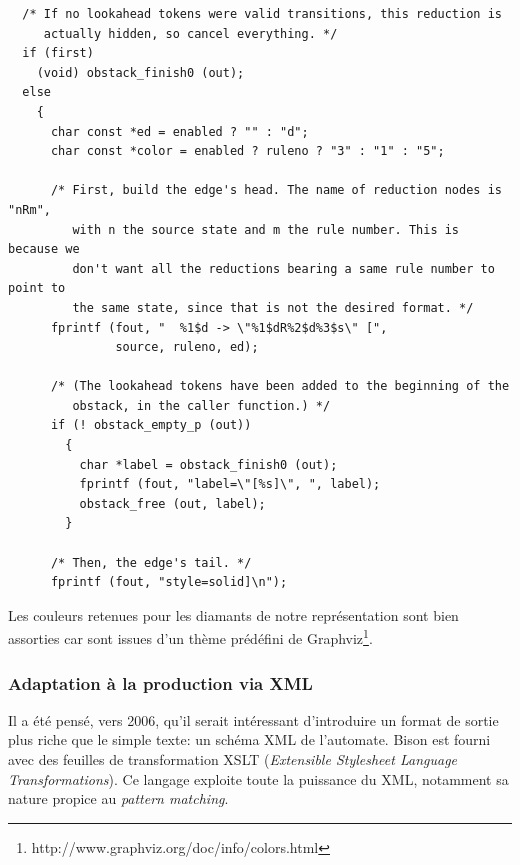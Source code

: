 \documentclass[a4paper,11pt,twoside,final]{article}
\begin{document}
  \begin{verbatim}
  /* If no lookahead tokens were valid transitions, this reduction is
     actually hidden, so cancel everything. */
  if (first)
    (void) obstack_finish0 (out);
  else
    {
      char const *ed = enabled ? "" : "d";
      char const *color = enabled ? ruleno ? "3" : "1" : "5";

      /* First, build the edge's head. The name of reduction nodes is "nRm",
         with n the source state and m the rule number. This is because we
         don't want all the reductions bearing a same rule number to point to
         the same state, since that is not the desired format. */
      fprintf (fout, "  %1$d -> \"%1$dR%2$d%3$s\" [",
               source, ruleno, ed);

      /* (The lookahead tokens have been added to the beginning of the
         obstack, in the caller function.) */
      if (! obstack_empty_p (out))
        {
          char *label = obstack_finish0 (out);
          fprintf (fout, "label=\"[%s]\", ", label);
          obstack_free (out, label);
        }

      /* Then, the edge's tail. */
      fprintf (fout, "style=solid]\n");
  \end{verbatim}

  Les couleurs retenues pour les \og diamants \fg de notre représentation sont
  bien assorties car sont issues d'un thème prédéfini de Graphviz\footnote{%
  http://www.graphviz.org/doc/info/colors.html}.

  \subsubsection{Adaptation à la production via XML}

  Il a été pensé, vers 2006, qu'il serait intéressant d'introduire un format
  de sortie plus riche que le simple texte: un schéma XML de l'automate. Bison
  est fourni avec des feuilles de transformation XSLT (\textit{Extensible
  Stylesheet Language Transformations}). Ce langage exploite toute la puissance
  du XML, notamment sa nature propice au \textit{pattern matching}.
\end{document}
